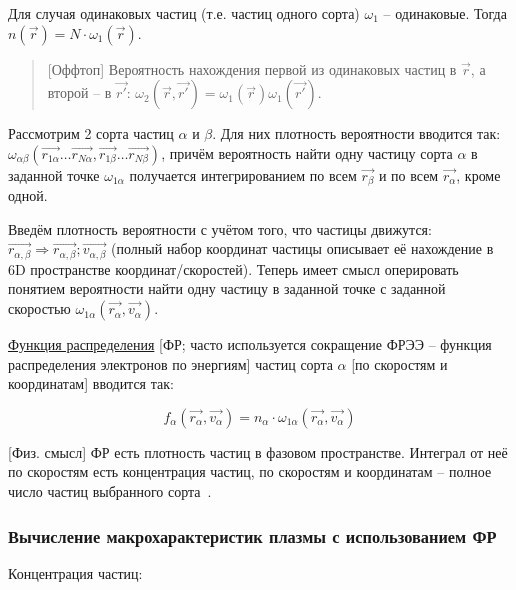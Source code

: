 \documentclass[10pt, a4paper]{article}
\begin{document}
Для случая одинаковых частиц (т.е. частиц одного сорта) $\omega_1$ -- одинаковые. Тогда $n(\vec{r}) = N\cdot\omega_1(\vec{r})$.

\begin{quotation}
	[Оффтоп] Вероятность нахождения первой из одинаковых частиц в $\vec{r}$, а второй -- в $\vec{r'}$: $\omega_2(\vec{r}, \vec{r'}) = \omega_1(\vec{r})\omega_{1}(\vec{r'})$.
\end{quotation}

Рассмотрим 2 сорта частиц $\alpha$ и $\beta$. Для них плотность вероятности вводится так: \newline $\omega_{\alpha\beta}(\overrightarrow{r_{1\alpha}}\ldots\overrightarrow{r_{N\alpha}},\overrightarrow{r_{1\beta}}\ldots\overrightarrow{r_{N\beta}})$, причём вероятность найти одну частицу сорта $\alpha$ в заданной точке $\omega_{1\alpha}$ получается интегрированием по всем $\vec{r_\beta}$ и по всем $\vec{r_\alpha}$, кроме одной.

Введём плотность вероятности с учётом того, что частицы движутся: $\overrightarrow{r_{\alpha, \beta}}\Rightarrow\overrightarrow{r_{\alpha, \beta}};\overrightarrow{v_{\alpha, \beta}}$ (полный набор координат частицы описывает её нахождение в 6D пространстве координат/скоростей). Теперь имеет смысл оперировать понятием вероятности найти одну частицу в заданной точке с заданной скоростью $\omega_{1\alpha}(\overrightarrow{r_\alpha}, \overrightarrow{v_\alpha})$.

\uline{Функция распределения} [ФР; часто используется сокращение ФРЭЭ -- функция распределения электронов по энергиям] частиц сорта $\alpha$ [по скоростям и координатам] вводится так:

\begin{equation} \label{eq:distribution_func}
	f_\alpha(\overrightarrow{r_\alpha}, \overrightarrow{v_\alpha}) = n_\alpha\cdot\omega_{1\alpha}(\overrightarrow{r_\alpha}, \overrightarrow{v_\alpha})
\end{equation}

[Физ. смысл] ФР есть плотность частиц в фазовом пространстве. Интеграл от неё по скоростям есть концентрация частиц, по скоростям и координатам -- полное число частиц выбранного сорта~\cite{kotelnikov}.

\subsubsection{Вычисление макрохарактеристик плазмы с использованием ФР}

Концентрация частиц:
\end{document}
